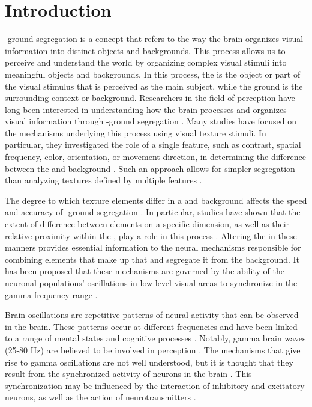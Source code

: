 \section{Introduction}
\label{sec:introduction}

\stimfigcap-ground segregation is a concept that refers to the way the brain organizes visual information into distinct objects and backgrounds. This process allows us to perceive and understand the world by organizing complex visual stimuli into meaningful objects and backgrounds. In this process, the \stimfig{} is the object or part of the visual stimulus that is perceived as the main subject, while the ground is the surrounding context or background. Researchers in the field of perception have long been interested in understanding how the brain processes and organizes visual information through \stimfig-ground segregation \cite{Julesz1983, Julesz1984, Nothdurft1985a, Williams1992, Wagemans2012}.
Many studies have focused on the mechanisms underlying this process using visual texture stimuli. In particular, they investigated the role of a single feature, such as contrast, spatial frequency, color, orientation, or movement direction, in determining the difference between the \stimfig{} and background \cite{Hadjipapas2015, Bredfeldt2002, Henriksson2008, Shapley2011, Lamme1995}. Such an approach allows for simpler segregation than analyzing textures defined by multiple features \cite{Sagi1984, Treisman1980}.

The degree to which texture elements differ in a \stimfig{} and background affects the speed and accuracy of \stimfig-ground segregation \cite{Nothdurft1985a, Nothdurft1985b, Landy1991, Motoyoshi1999, Nothdurft1991a, Nothdurft1991b, DeWeerd1992}.
In particular, studies have shown that the extent of difference between elements on a specific dimension, as well as their relative proximity within the \stimfig, play a role in this process \cite{MaryamPLACEHOLDER}. Altering the \stimfig{} in these manners provides essential information to the neural mechanisms responsible for combining elements that make up that \stimfig{} and segregate it from the background. It has been proposed that these mechanisms are governed by the ability of the neuronal populations' oscillations in low-level visual areas to synchronize in the gamma frequency range \cite{Malsburg1995, Singer1995a, Gray1999}.

Brain oscillations are repetitive patterns of neural activity that can be observed in the brain. These patterns occur at different frequencies and have been linked to a range of mental states and cognitive processes \cite{BuzsakiBook2006:5}. Notably, gamma brain waves (25-80 Hz) are believed to be involved in perception \cite{Eckhorn1988, Gray1989, Kreiter1996, Livingstone1996, Fries1997, Gail2000}. The mechanisms that give rise to gamma oscillations are not well understood, but it is thought that they result from the synchronized activity of neurons in the brain \cite{Wang1996, Buzsaki2012, Fries2015}. This synchronization may be influenced by the interaction of inhibitory and excitatory neurons, as well as the action of neurotransmitters \cite{Fries2007, Tiesinga2009, Tiesinga2010}. 


